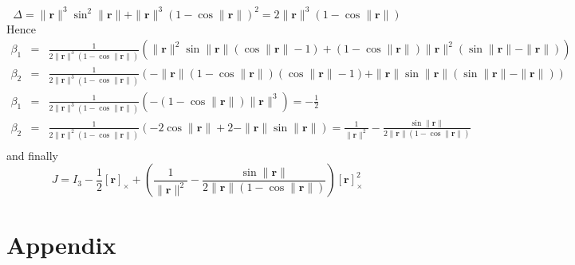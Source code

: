 \documentclass {article}
\newcommand\rot{\mathbf{r}}
\newcommand\rcross{[\rot]_{\times}}
\newcommand\normr{\|\rot\|}
\begin{document}
$$
\Delta = \normr^3\sin^2\normr + \normr^3 (1-\cos\normr)^2 = 2\normr^3(1 -\cos\normr)
$$
Hence
\begin{eqnarray*}
\beta_1 &=& \frac{1}{2\normr^3(1 -\cos\normr)}\left(\normr^2\sin\normr (\cos \normr - 1) + (1 - \cos \normr)\normr^2(\sin\normr - \normr)\right) \\
\beta_2 &=& \frac{1}{2\normr^3(1 -\cos\normr)}\left(-\normr(1 - \cos \normr)(\cos \normr - 1) + \normr\sin\normr(\sin\normr - \normr)\right)\\
\beta_1 &=& \frac{1}{2\normr^3(1 -\cos\normr)}\left(-(1 - \cos \normr)\normr^3\right) = -\frac{1}{2}\\
\beta_2 &=& \frac{1}{2\normr^2(1 -\cos\normr)}\left(-2\cos \normr + 2 - \normr\sin\normr\right) = \frac{1}{\normr^2} - \frac{\sin\normr}{2\normr(1-\cos\normr)}\\
\end{eqnarray*}
and finally
$$
J = I_3 -\frac{1}{2}\rcross +  \left(\frac{1}{\normr^2} - \frac{\sin\normr}{2\normr(1-\cos\normr)}\right)\rcross^2
$$



\section{Appendix}
\end{document}
